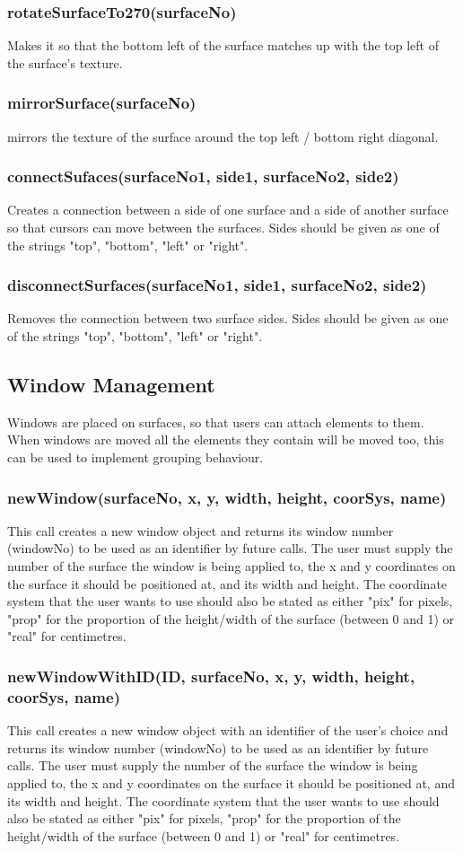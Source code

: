 \documentclass{acm_proc_article-sp}
\begin{document}
\subsubsection{rotateSurfaceTo270(surfaceNo)}
Makes it so that the bottom left of the surface matches up with the top left of the surface's texture.
\subsubsection{mirrorSurface(surfaceNo)}
mirrors the texture of the surface around the top left / bottom right diagonal.
\subsubsection{connectSufaces(surfaceNo1, side1, surfaceNo2, side2)}
Creates a connection between a side of one surface and a side of another surface so that cursors can move between the surfaces. Sides should be given as one of the strings "top", "bottom", "left" or "right".
\subsubsection{disconnectSurfaces(surfaceNo1, side1, surfaceNo2, side2)}
Removes the connection between two surface sides. Sides should be given as one of the strings "top", "bottom", "left" or "right".

\subsection{Window Management}
Windows are placed on surfaces, so that users can attach elements to them. When windows are moved all the elements they contain will be moved too, this can be used to implement grouping behaviour.
\subsubsection{newWindow(surfaceNo, x, y, width, height, coorSys, name)}
This call creates a new window object and returns its window number (windowNo) to be used as an identifier by future calls. The user must supply the number of the surface the window is being applied to, the x and y coordinates on the surface it should be positioned at, and its width and height. The coordinate system that the user wants to use should also be stated as either "pix" for pixels, "prop" for the proportion of the height/width of the surface (between 0 and 1) or "real" for centimetres.
\subsubsection{newWindowWithID(ID, surfaceNo, x, y, width, height, coorSys, name)}
This call creates a new window object with an identifier of the user's choice and returns its window number (windowNo) to be used as an identifier by future calls. The user must supply the number of the surface the window is being applied to, the x and y coordinates on the surface it should be positioned at, and its width and height. The coordinate system that the user wants to use should also be stated as either "pix" for pixels, "prop" for the proportion of the height/width of the surface (between 0 and 1) or "real" for centimetres.
\end{document}
